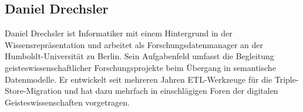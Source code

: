 \subsection*{Daniel Drechsler}
Daniel Drechsler ist Informatiker mit einem Hintergrund in der Wissensrepräsentation und arbeitet als Forschungsdatenmanager an der Humboldt-Universität zu Berlin. Sein Aufgabenfeld umfasst die Begleitung geisteswissenschaftlicher Forschungsprojekte beim Übergang in semantische Datenmodelle. Er entwickelt seit mehreren Jahren ETL-Werkzeuge für die Triple-Store-Migration und hat dazu mehrfach in einschlägigen Foren der digitalen Geisteswissenschaften vorgetragen.

